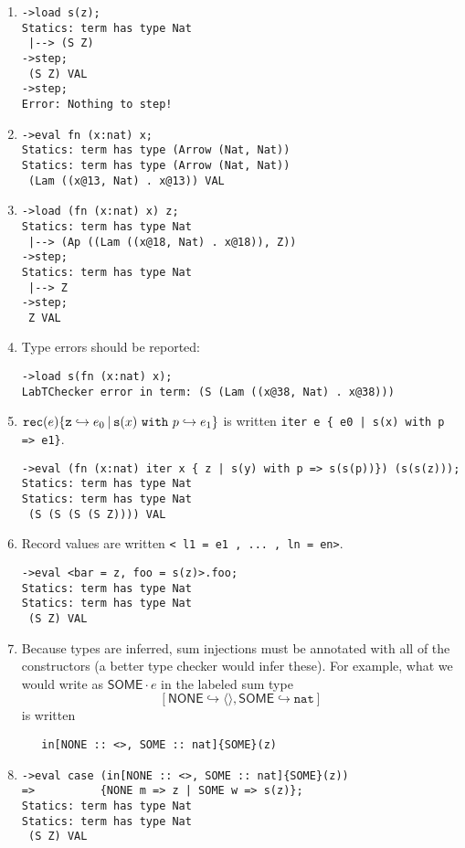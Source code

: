 \documentclass[11pt]{article}
\newcommand\sml[1]{\texttt{#1}}
\newcommand{\irl}[1]{\mathtt{#1}}
\newcommand{\natt}{\irl{nat}}
\newcommand{\goesto}{\hookrightarrow}
\newcommand{\hra}{\hookrightarrow}
\newcommand{\suc}[1]{\irl{s}(#1)}
\newcommand{\rec}[5]{\irl{rec}(#1) \{\irl{z} \goesto #2 \por \suc{#3} ~\irl{with}~#4 \goesto #5\} }
\newcommand{\lsumt}[1]{[#1]}
\newcommand{\inj}[3]{{#2}\cdot{#3}}
\newcommand{\por}{\hspace*{.2em}|\hspace*{.2em}}
\begin{document}
\begin{enumerate}
\item 
\begin{verbatim}
->load s(z);
Statics: term has type Nat
 |--> (S Z)
->step;
 (S Z) VAL
->step;
Error: Nothing to step!
\end{verbatim}

\item 
\begin{verbatim}
->eval fn (x:nat) x;
Statics: term has type (Arrow (Nat, Nat))
Statics: term has type (Arrow (Nat, Nat))
 (Lam ((x@13, Nat) . x@13)) VAL
\end{verbatim}

\item 
\begin{verbatim}
->load (fn (x:nat) x) z;
Statics: term has type Nat
 |--> (Ap ((Lam ((x@18, Nat) . x@18)), Z))
->step;
Statics: term has type Nat
 |--> Z
->step;
 Z VAL
\end{verbatim}

\item Type errors should be reported:   
\begin{verbatim}
->load s(fn (x:nat) x);
LabTChecker error in term: (S (Lam ((x@38, Nat) . x@38)))
\end{verbatim}

\item $\rec{e}{e_0}{x}{p}{e_1}$ is written \sml{iter e \{ e0 | s(x) with p => e1\}}.  
\begin{verbatim}
->eval (fn (x:nat) iter x { z | s(y) with p => s(s(p))}) (s(s(z)));
Statics: term has type Nat
Statics: term has type Nat
 (S (S (S (S Z)))) VAL
\end{verbatim}

\item Record values are written \sml{< l1 = e1 , ... , ln = en>}.  

\begin{verbatim}
->eval <bar = z, foo = s(z)>.foo;
Statics: term has type Nat
Statics: term has type Nat
 (S Z) VAL
\end{verbatim}

\item Because types are inferred, sum injections must be annotated with
  all of the constructors (a better type checker would infer these).
  For example, what we would write as $\inj{}{\mathsf{SOME}}{e}$ in the
  labeled sum type 
  \[
  \lsumt{\mathsf{NONE} \hra \langle\rangle, \mathsf{SOME} \hra \natt}
  \]
  is written 
\begin{verbatim}
   in[NONE :: <>, SOME :: nat]{SOME}(z)
\end{verbatim}

\item 
\begin{verbatim}
->eval case (in[NONE :: <>, SOME :: nat]{SOME}(z))
=>          {NONE m => z | SOME w => s(z)};
Statics: term has type Nat
Statics: term has type Nat
 (S Z) VAL
\end{verbatim}
\end{enumerate}
\end{document}
